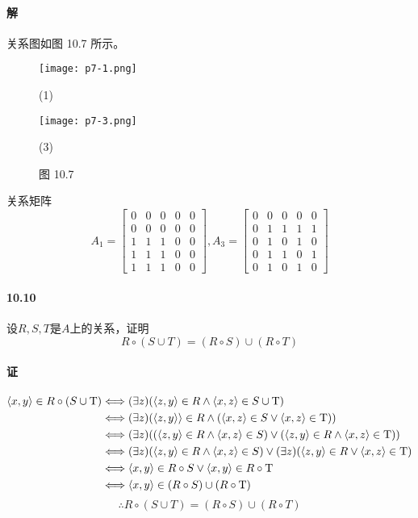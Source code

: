 \documentclass[UTF8]{ctexart}
\newcommand{\true}{{\rm T}}
\begin{document}
\paragraph{解} 关系图如图 10.7 所示。
\begin{figure}[!htb]
    \centering
    \begin{minipage}[t]{0.221\textwidth}
    \centering
    \texttt{[image: p7-1.png]}
    \caption*{(1)}
    \end{minipage}
    \begin{minipage}[t]{0.221\textwidth}
    \centering
    \texttt{[image: p7-3.png]}
    \caption*{(3)}
    \end{minipage}
    \caption*{图 10.7}
\end{figure}
关系矩阵
$$A_1 = \begin{bmatrix}
    0 & 0 & 0 & 0 & 0 \\
    0 & 0 & 0 & 0 & 0 \\
    1 & 1 & 1 & 0 & 0 \\
    1 & 1 & 1 & 0 & 0 \\
    1 & 1 & 1 & 0 & 0
\end{bmatrix},
A_3 = \begin{bmatrix}
    0 & 0 & 0 & 0 & 0 \\
    0 & 1 & 1 & 1 & 1 \\
    0 & 1 & 0 & 1 & 0 \\
    0 & 1 & 1 & 0 & 1 \\
    0 & 1 & 0 & 1 & 0
\end{bmatrix}$$

\paragraph{10.10}\label{10.10}
设$R,S,T$是$A$上的关系，证明
$$R\circ (S \cup T) = (R \circ S) \cup (R \circ T)$$
\paragraph{证}
\begin{align*}
    \langle x,y \rangle \in R \circ (S \cup \true ) & \Longleftrightarrow ( \exists z)( \langle z,y \rangle \in R \land \langle x,z \rangle \in S \cup \true ) \\
    & \Longleftrightarrow ( \exists z)( \langle z,y \rangle \rangle \in R \land ( \langle x,z \rangle \in S \lor \langle x,z \rangle \in \true )) \\
    & \Longleftrightarrow ( \exists z)(( \langle z,y \rangle \in R \land \langle x,z \rangle \in S) \lor ( \langle z,y \rangle \in R \land \langle x,z \rangle \in \true )) \\
    & \Longleftrightarrow ( \exists z)( \langle z,y \rangle \in R \land \langle x,z \rangle \in S) \lor ( \exists z)( \langle z,y \rangle \in R \lor \langle x,z \rangle \in \true ) \\
    & \Longleftrightarrow \langle x,y \rangle \in R \circ S \lor \langle x,y \rangle \in R \circ \true \\
    & \Longleftrightarrow \langle x,y \rangle \in (R \circ S) \cup (R \circ \true )
\end{align*}
$$\therefore R\circ (S \cup T) = (R \circ S) \cup (R \circ T)$$
\end{document}
